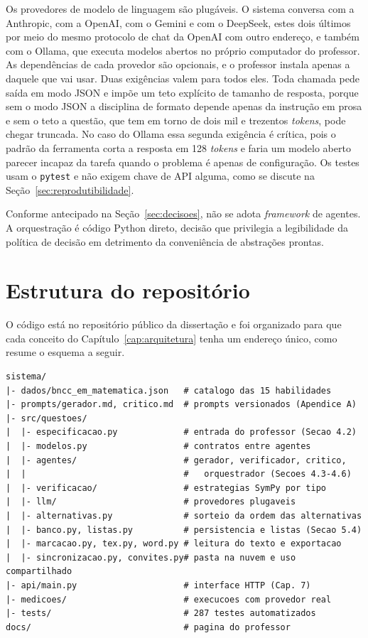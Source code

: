 Os provedores de modelo de linguagem são plugáveis. O sistema conversa com a Anthropic, com a
OpenAI, com o Gemini e com o DeepSeek, estes dois últimos por meio do mesmo protocolo de chat da
OpenAI com outro endereço, e também com o Ollama, que executa modelos abertos no próprio
computador do professor. As dependências de cada provedor são opcionais, e o professor instala
apenas a daquele que vai usar. Duas exigências valem para todos eles. Toda chamada pede saída em
modo JSON e impõe um teto explícito de tamanho de resposta, porque sem o modo JSON a disciplina de
formato depende apenas da instrução em prosa e sem o teto a questão, que tem em torno de dois mil
e trezentos \emph{tokens}, pode chegar truncada. No caso do Ollama essa segunda exigência é crítica,
pois o padrão da ferramenta corta a resposta em 128 \emph{tokens} e faria um modelo aberto parecer
incapaz da tarefa quando o problema é apenas de configuração. Os testes usam o \texttt{pytest} e
não exigem chave de API alguma, como se discute na Seção~\ref{sec:reprodutibilidade}.

Conforme antecipado na Seção~\ref{sec:decisoes}, não se adota \emph{framework} de agentes. A
orquestração é código Python direto, decisão que privilegia a legibilidade da política de decisão
em detrimento da conveniência de abstrações prontas.

\section{Estrutura do repositório}
\label{sec:repositorio}

O código está no repositório público da dissertação e foi organizado para que cada conceito do
Capítulo~\ref{cap:arquitetura} tenha um endereço único, como resume o esquema a seguir.

\begin{verbatim}
sistema/
|- dados/bncc_em_matematica.json   # catalogo das 15 habilidades
|- prompts/gerador.md, critico.md  # prompts versionados (Apendice A)
|- src/questoes/
|  |- especificacao.py             # entrada do professor (Secao 4.2)
|  |- modelos.py                   # contratos entre agentes
|  |- agentes/                     # gerador, verificador, critico,
|  |                               #   orquestrador (Secoes 4.3-4.6)
|  |- verificacao/                 # estrategias SymPy por tipo
|  |- llm/                         # provedores plugaveis
|  |- alternativas.py              # sorteio da ordem das alternativas
|  |- banco.py, listas.py          # persistencia e listas (Secao 5.4)
|  |- marcacao.py, tex.py, word.py # leitura do texto e exportacao
|  |- sincronizacao.py, convites.py# pasta na nuvem e uso compartilhado
|- api/main.py                     # interface HTTP (Cap. 7)
|- medicoes/                       # execucoes com provedor real
|- tests/                          # 287 testes automatizados
docs/                              # pagina do professor
\end{verbatim}

